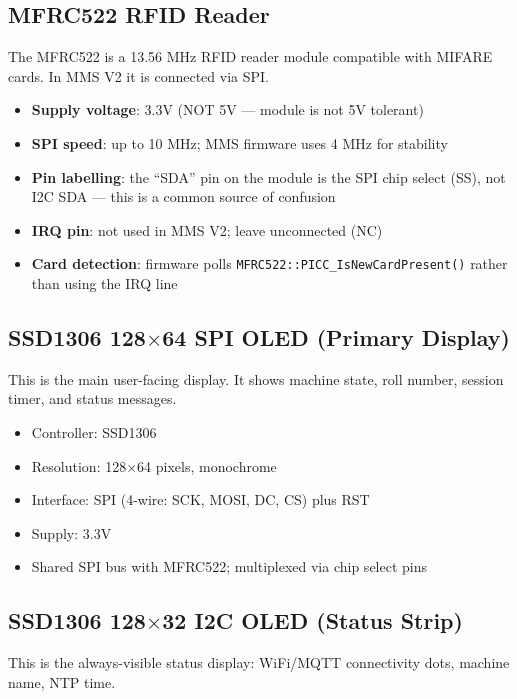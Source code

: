\subsection{MFRC522 RFID Reader}

The MFRC522 is a 13.56 MHz RFID reader module compatible with MIFARE cards. In MMS V2 it is connected via SPI.

\begin{itemize}[leftmargin=1.5em]
    \item \textbf{Supply voltage}: 3.3V (NOT 5V --- module is not 5V tolerant)
    \item \textbf{SPI speed}: up to 10 MHz; MMS firmware uses 4 MHz for stability
    \item \textbf{Pin labelling}: the ``SDA'' pin on the module is the SPI chip select (SS), not I2C SDA --- this is a common source of confusion
    \item \textbf{IRQ pin}: not used in MMS V2; leave unconnected (NC)
    \item \textbf{Card detection}: firmware polls \texttt{MFRC522::PICC\_IsNewCardPresent()} rather than using the IRQ line
\end{itemize}

\subsection{SSD1306 128$\times$64 SPI OLED (Primary Display)}

This is the main user-facing display. It shows machine state, roll number, session timer, and status messages.

\begin{itemize}[leftmargin=1.5em]
    \item Controller: SSD1306
    \item Resolution: 128$\times$64 pixels, monochrome
    \item Interface: SPI (4-wire: SCK, MOSI, DC, CS) plus RST
    \item Supply: 3.3V
    \item Shared SPI bus with MFRC522; multiplexed via chip select pins
\end{itemize}

\subsection{SSD1306 128$\times$32 I2C OLED (Status Strip)}

This is the always-visible status display: WiFi/MQTT connectivity dots, machine name, NTP time.

